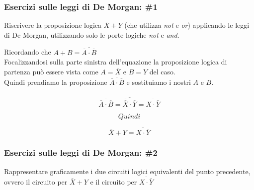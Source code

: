 \begin{frame}
	\frametitle{Esercizi sulle leggi di De Morgan: \#1}

	\begin{block}{Riscrivere la proposizione logica $\overline{X} + Y$ (che utilizza \textit{not} e \textit{or}) applicando le leggi di De Morgan, utilizzando solo le porte logiche \textit{not} e \textit{and}.}
		
		Ricordando che $A + B = \overline{\overline {A} \cdot \overline {B}}$\\
		Focalizzandosi sulla parte sinistra dell'equazione la proposizione logica di partenza può essere vista come $A = \overline {X}$ e $B = Y$ del caso.\\
		Quindi prendiamo la proposizione $\overline{\overline {A} \cdot \overline {B}}$ e sostituiamo i nostri $A$ e $B$.\\~\\
		
		$$\overline{\overline {A} \cdot \overline {B}} = \overline{\overline {\overline {X}} \cdot \overline {Y}} = \overline{X \cdot \overline {Y}}$$
		
		$$Quindi$$
		
		$$\overline{X} + Y = \overline{X \cdot \overline {Y}}$$
		
		
			
	\end{block}
	
\end{frame}


\begin{frame}
	\frametitle{Esercizi sulle leggi di De Morgan: \#2}

	\begin{block}{Rappresentare graficamente i due circuiti logici equivalenti del punto precedente, ovvero il circuito per $\overline{X} + Y$ e il circuito per $\overline{X \cdot \overline {Y}}$}
		
			
	\end{block}
	
\end{frame}



